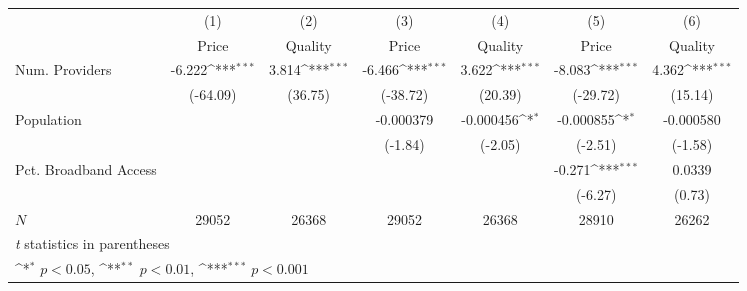 {
\def\sym#1{\ifmmode^{#1}\else\(^{#1}\)\fi}
\begin{tabular}{l*{6}{c}}
\hline\hline
          &\multicolumn{1}{c}{(1)}&\multicolumn{1}{c}{(2)}&\multicolumn{1}{c}{(3)}&\multicolumn{1}{c}{(4)}&\multicolumn{1}{c}{(5)}&\multicolumn{1}{c}{(6)}\\
          &\multicolumn{1}{c}{Price}&\multicolumn{1}{c}{Quality}&\multicolumn{1}{c}{Price}&\multicolumn{1}{c}{Quality}&\multicolumn{1}{c}{Price}&\multicolumn{1}{c}{Quality}\\
\hline
Num. Providers&   -6.222\sym{***}&    3.814\sym{***}&   -6.466\sym{***}&    3.622\sym{***}&   -8.083\sym{***}&    4.362\sym{***}\\
          & (-64.09)         &  (36.75)         & (-38.72)         &  (20.39)         & (-29.72)         &  (15.14)         \\
[1em]
Population&                  &                  &-0.000379         &-0.000456\sym{*}  &-0.000855\sym{*}  &-0.000580         \\
          &                  &                  &  (-1.84)         &  (-2.05)         &  (-2.51)         &  (-1.58)         \\
[1em]
Pct. Broadband Access&                  &                  &                  &                  &   -0.271\sym{***}&   0.0339         \\
          &                  &                  &                  &                  &  (-6.27)         &   (0.73)         \\
\hline
\(N\)     &    29052         &    26368         &    29052         &    26368         &    28910         &    26262         \\
\hline\hline
\multicolumn{7}{l}{\footnotesize \textit{t} statistics in parentheses}\\
\multicolumn{7}{l}{\footnotesize \sym{*} \(p<0.05\), \sym{**} \(p<0.01\), \sym{***} \(p<0.001\)}\\
\end{tabular}
}
